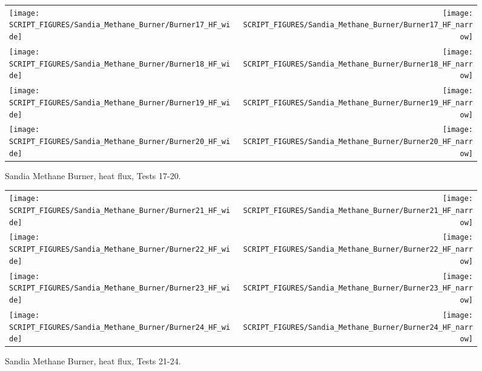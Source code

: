 \begin{figure}[p]
\begin{tabular*}{\textwidth}{l@{\extracolsep{\fill}}r}
\texttt{[image: SCRIPT\_FIGURES/Sandia\_Methane\_Burner/Burner17\_HF\_wide]} &
\texttt{[image: SCRIPT\_FIGURES/Sandia\_Methane\_Burner/Burner17\_HF\_narrow]} \\
\texttt{[image: SCRIPT\_FIGURES/Sandia\_Methane\_Burner/Burner18\_HF\_wide]} &
\texttt{[image: SCRIPT\_FIGURES/Sandia\_Methane\_Burner/Burner18\_HF\_narrow]} \\
\texttt{[image: SCRIPT\_FIGURES/Sandia\_Methane\_Burner/Burner19\_HF\_wide]} &
\texttt{[image: SCRIPT\_FIGURES/Sandia\_Methane\_Burner/Burner19\_HF\_narrow]} \\
\texttt{[image: SCRIPT\_FIGURES/Sandia\_Methane\_Burner/Burner20\_HF\_wide]} &
\texttt{[image: SCRIPT\_FIGURES/Sandia\_Methane\_Burner/Burner20\_HF\_narrow]}
\end{tabular*}
\caption[Sandia Methane Burner, heat flux, Tests 17-20] {Sandia Methane Burner, heat flux, Tests 17-20.}
\label{Sandia_Methane_Burner_HF_5}
\end{figure}

\begin{figure}[p]
\begin{tabular*}{\textwidth}{l@{\extracolsep{\fill}}r}
\texttt{[image: SCRIPT\_FIGURES/Sandia\_Methane\_Burner/Burner21\_HF\_wide]} &
\texttt{[image: SCRIPT\_FIGURES/Sandia\_Methane\_Burner/Burner21\_HF\_narrow]} \\
\texttt{[image: SCRIPT\_FIGURES/Sandia\_Methane\_Burner/Burner22\_HF\_wide]} &
\texttt{[image: SCRIPT\_FIGURES/Sandia\_Methane\_Burner/Burner22\_HF\_narrow]} \\
\texttt{[image: SCRIPT\_FIGURES/Sandia\_Methane\_Burner/Burner23\_HF\_wide]} &
\texttt{[image: SCRIPT\_FIGURES/Sandia\_Methane\_Burner/Burner23\_HF\_narrow]} \\
\texttt{[image: SCRIPT\_FIGURES/Sandia\_Methane\_Burner/Burner24\_HF\_wide]} &
\texttt{[image: SCRIPT\_FIGURES/Sandia\_Methane\_Burner/Burner24\_HF\_narrow]}
\end{tabular*}
\caption[Sandia Methane Burner, heat flux, Tests 21-24] {Sandia Methane Burner, heat flux, Tests 21-24.}
\label{Sandia_Methane_Burner_HF_6}
\end{figure}

